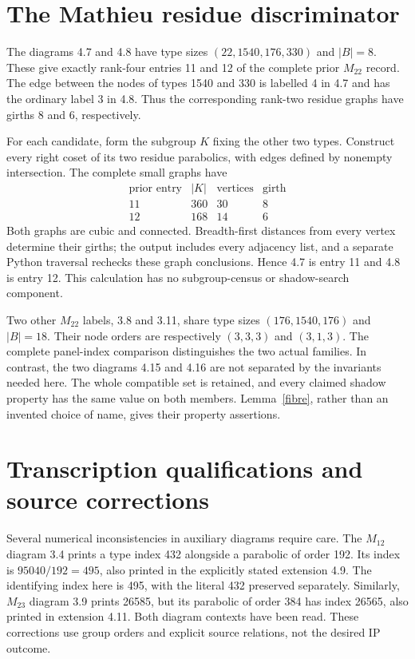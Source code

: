 \documentclass[11pt,a4paper]{article}
\begin{document}
\section{The Mathieu residue discriminator}
The diagrams 4.7 and 4.8 have type sizes $(22,1540,176,330)$
and $|B|=8$. These give exactly rank-four entries 11 and 12 of the
complete prior $M_{22}$ record. The edge between the nodes of types
1540 and 330 is labelled 4 in 4.7 and has the ordinary label 3 in
4.8. Thus the corresponding rank-two residue graphs have girths 8
and 6, respectively.

For each candidate, form the subgroup $K$ fixing the other two types.
Construct every right coset of its two residue parabolics, with edges
defined by nonempty intersection. The complete small graphs have
\[
\begin{array}{c|rrr}
\text{prior entry}&|K|&\text{vertices}&\text{girth}\\\hline
11&360&30&8\\
12&168&14&6
\end{array}
\]
Both graphs are cubic and connected. Breadth-first distances from
every vertex determine their girths; the output includes every
adjacency list, and a separate Python traversal rechecks these
graph conclusions. Hence 4.7 is entry 11 and 4.8 is entry 12.
This calculation has no subgroup-census or shadow-search component.

Two other $M_{22}$ labels, 3.8 and 3.11, share type sizes
$(176,1540,176)$ and $|B|=18$. Their node orders are respectively
$(3,3,3)$ and $(3,1,3)$. The complete panel-index comparison
distinguishes the two actual families. In contrast, the two diagrams
4.15 and 4.16 are not separated by the invariants needed here. The
whole compatible set is retained, and every claimed shadow property
has the same value on both members. Lemma~\ref{fibre}, rather than
an invented choice of name, gives their property assertions.

\section{Transcription qualifications and source corrections}
Several numerical inconsistencies in auxiliary diagrams require care.
The $M_{12}$ diagram 3.4 prints a type index 432 alongside a
parabolic of order 192. Its index is $95040/192=495$, also printed
in the explicitly stated extension 4.9. The identifying index here
is 495, with the literal 432 preserved separately. Similarly,
$M_{23}$ diagram 3.9 prints 26585, but its parabolic of order 384
has index 26565, also printed in extension 4.11. Both diagram
contexts have been read. These corrections use group orders and
explicit source relations, not the desired IP outcome.
\end{document}
